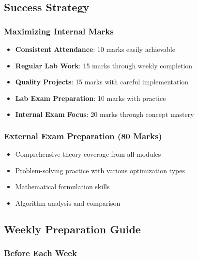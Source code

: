 \documentclass[
  letterpaper,
  DIV=11,
  numbers=noendperiod]{scrreprt}
\providecommand{\tightlist}{%
  \setlength{\itemsep}{0pt}\setlength{\parskip}{0pt}}
\begin{document}
\subsection*{Success Strategy}\label{success-strategy}

\subsubsection*{Maximizing Internal
Marks}\label{maximizing-internal-marks}

\begin{itemize}
\tightlist
\item
  \textbf{Consistent Attendance}: 10 marks easily achievable
\item
  \textbf{Regular Lab Work}: 15 marks through weekly completion
\item
  \textbf{Quality Projects}: 15 marks with careful implementation
\item
  \textbf{Lab Exam Preparation}: 10 marks with practice
\item
  \textbf{Internal Exam Focus}: 20 marks through concept mastery
\end{itemize}

\subsubsection*{External Exam Preparation (80
Marks)}\label{external-exam-preparation-80-marks}

\begin{itemize}
\tightlist
\item
  Comprehensive theory coverage from all modules
\item
  Problem-solving practice with various optimization types
\item
  Mathematical formulation skills
\item
  Algorithm analysis and comparison
\end{itemize}

\subsection*{Weekly Preparation Guide}\label{weekly-preparation-guide}

\subsubsection*{Before Each Week}\label{before-each-week}
\end{document}
